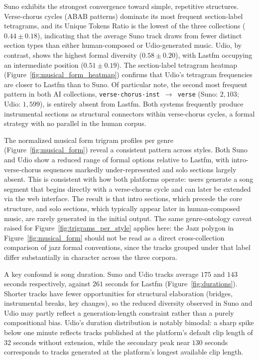 \documentclass{article}
\begin{document}
Suno exhibits the strongest convergence toward simple, repetitive structures. Verse-chorus cycles (ABAB patterns) dominate its most frequent section-label tetragrams, and its Unique Tokens Ratio is the lowest of the three collections ($0.44 \pm 0.18$), indicating that the average Suno track draws from fewer distinct section types than either human-composed or Udio-generated music. Udio, by contrast, shows the highest formal diversity ($0.58 \pm 0.20$), with Lastfm occupying an intermediate position ($0.51 \pm 0.19$). The section-label tetragram heatmap (Figure~\ref{fig:musical_form_heatmap}) confirms that Udio's tetragram frequencies are closer to Lastfm than to Suno. Of particular note, the second most frequent pattern in both AI collections, \texttt{verse·chorus·inst~$\rightarrow$~verse} (Suno: $2,103$; Udio: $1,599$), is entirely absent from Lastfm. Both systems frequently produce instrumental sections as structural connectors within verse-chorus cycles, a formal strategy with no parallel in the human corpus. 

The normalized musical form trigram profiles per genre (Figure~\ref{fig:musical_form}) reveal a consistent pattern across styles. Both Suno and Udio show a reduced range of formal options relative to Lastfm, with intro-verse-chorus sequences markedly under-represented and solo sections largely absent. This is consistent with how both platforms operate: users generate a song segment that begins directly with a verse-chorus cycle and can later be extended via the web interface. The result is that intro sections, which precede the core structure, and solo sections, which typically appear later in human-composed music, are rarely generated in the initial output. The same genre-ontology caveat raised for Figure~\ref{fig:trigrams_per_style} applies here: the Jazz polygon in Figure~\ref{fig:musical_form} should not be read as a direct cross-collection comparison of jazz formal conventions, since the tracks grouped under that label differ substantially in character across the three corpora.

A key confound is song duration. 
Suno  and Udio tracks average $175$ and $143$ seconds respectively, against $261$ seconds for Lastfm (Figure~\ref{fig:durations}). 
Shorter tracks have fewer opportunities for structural elaboration (bridges, instrumental breaks, key changes), so the reduced diversity observed in Suno and Udio may partly reflect a generation-length constraint rather than a purely compositional bias. Udio's duration distribution is notably bimodal: a sharp spike below one minute reflects tracks published at the platform's default clip length of 32 seconds without extension, while the secondary peak near $130$ seconds corresponds to tracks generated at the platform's longest available clip length.
\end{document}
